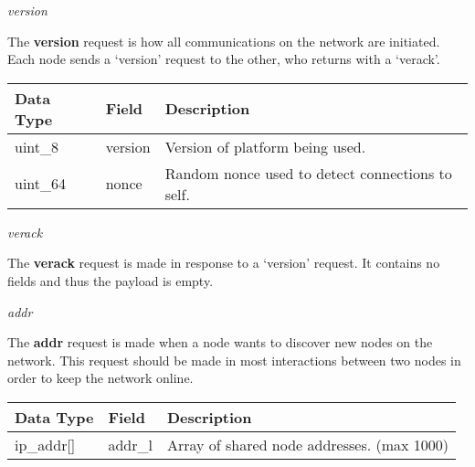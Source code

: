 \documentclass{article}
\begin{document}
\begin{center}
    \large \textit{version}
\end{center}
The \textbf{version} request is how all communications on the network are initiated. Each node sends a `version' request to the other, who returns with a `verack'.
\begin{table}[H]
\centering
\begin{tabular}{|p{1.5cm}|p{2.5cm}|p{5.5cm}|}
\hline
\rowcolor{tblgrey}
Data Type   & Field       & Description\\ \hline
uint\_8     & version     & Version of platform being used.                          \\ \hline
uint\_64    & nonce       & Random nonce used to detect connections to self.                   \\ \hline
\end{tabular}
\end{table}

\begin{center}
    \large \textit{verack}
\end{center}
The \textbf{verack} request is made in response to a `version' request. It contains no fields and thus the payload is empty.

\begin{center}
    \large \textit{addr}
\end{center}
The \textbf{addr} request is made when a node wants to discover new nodes on the network. This request should be made in most interactions between two nodes in order to keep the network online.
\begin{table}[H]
\centering
\begin{tabular}{|p{1.5cm}|p{2.5cm}|p{5.5cm}|}
\hline
\rowcolor{tblgrey}
Data Type   & Field       & Description\\ \hline
ip\_addr[\hspace{0.05cm}] & addr\_l       & Array of shared node addresses. (max 1000)                               \\ \hline
\end{tabular}
\end{table}
\end{document}
